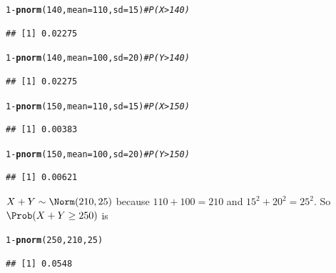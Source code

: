 \documentclass[twoside]{book}\usepackage[]{graphicx}\usepackage[]{xcolor}
\makeatletter
\newcommand{\hlnum}[1]{\textcolor[rgb]{0.686,0.059,0.569}{#1}}%
\newcommand{\hlcom}[1]{\textcolor[rgb]{0.678,0.584,0.686}{\textit{#1}}}%
\newcommand{\hlopt}[1]{\textcolor[rgb]{0,0,0}{#1}}%
\newcommand{\hlstd}[1]{\textcolor[rgb]{0.345,0.345,0.345}{#1}}%
\newcommand{\hlkwc}[1]{\textcolor[rgb]{0.333,0.667,0.333}{#1}}%
\newcommand{\hlkwd}[1]{\textcolor[rgb]{0.737,0.353,0.396}{\textbf{#1}}}%
\newenvironment{kframe}{%
 \def\at@end@of@kframe{}%
 \ifinner\ifhmode%
  \def\at@end@of@kframe{\end{minipage}}%
  \begin{minipage}{\columnwidth}%
 \fi\fi%
 \def\FrameCommand##1{\hskip\@totalleftmargin \hskip-\fboxsep
 \colorbox{shadecolor}{##1}\hskip-\fboxsep
     \hskip-\linewidth \hskip-\@totalleftmargin \hskip\columnwidth}%
 \MakeFramed {\advance\hsize-\width
   \@totalleftmargin\z@ \linewidth\hsize
   \@setminipage}}%
 {\par\unskip\endMakeFramed%
 \at@end@of@kframe}
\newenvironment{knitrout}{}{} %
\makeatother
\begin{document}
\begin{solution}
\begin{knitrout}
\color{fgcolor}\begin{kframe}
\begin{alltt}
\hlnum{1} \hlopt{-} \hlkwd{pnorm}\hlstd{(}\hlnum{140}\hlstd{,} \hlkwc{mean} \hlstd{=} \hlnum{110}\hlstd{,} \hlkwc{sd} \hlstd{=} \hlnum{15}\hlstd{)} \hlcom{#  P(X > 140)}
\end{alltt}
\begin{verbatim}
## [1] 0.02275
\end{verbatim}
\begin{alltt}
\hlnum{1} \hlopt{-} \hlkwd{pnorm}\hlstd{(}\hlnum{140}\hlstd{,} \hlkwc{mean} \hlstd{=} \hlnum{100}\hlstd{,} \hlkwc{sd} \hlstd{=} \hlnum{20}\hlstd{)} \hlcom{#  P(Y > 140)}
\end{alltt}
\begin{verbatim}
## [1] 0.02275
\end{verbatim}
\begin{alltt}
\hlnum{1} \hlopt{-} \hlkwd{pnorm}\hlstd{(}\hlnum{150}\hlstd{,} \hlkwc{mean} \hlstd{=} \hlnum{110}\hlstd{,} \hlkwc{sd} \hlstd{=} \hlnum{15}\hlstd{)} \hlcom{#  P(X > 150)}
\end{alltt}
\begin{verbatim}
## [1] 0.00383
\end{verbatim}
\begin{alltt}
\hlnum{1} \hlopt{-} \hlkwd{pnorm}\hlstd{(}\hlnum{150}\hlstd{,} \hlkwc{mean} \hlstd{=} \hlnum{100}\hlstd{,} \hlkwc{sd} \hlstd{=} \hlnum{20}\hlstd{)} \hlcom{#  P(Y > 150)}
\end{alltt}
\begin{verbatim}
## [1] 0.00621
\end{verbatim}
\end{kframe}
\end{knitrout}
$X + Y \sim \Norm(210, 25 )$ because $110 + 100 = 210$ and $15^2 + 20^2 = 25^2$.  
So $\Prob(X + Y \ge 250)$ is
\begin{knitrout}
\color{fgcolor}\begin{kframe}
\begin{alltt}
\hlnum{1} \hlopt{-} \hlkwd{pnorm}\hlstd{(}\hlnum{250}\hlstd{,} \hlnum{210}\hlstd{,} \hlnum{25}\hlstd{)}
\end{alltt}
\begin{verbatim}
## [1] 0.0548
\end{verbatim}
\end{kframe}

\end{knitrout}
\end{solution}
\end{document}
